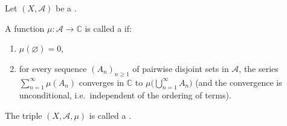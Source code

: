 \begin{definition} \label{definition:complex_measure}
Let $(X, \mathcal{A})$ be a .

A function $\mu : \mathcal{A} \to \mathbb{C}$ is called a  if:
\begin{enumerate}
    \item $\mu(\varnothing) = 0$,
    \item for every sequence $(A_n)_{n\ge 1}$ of pairwise disjoint sets in $\mathcal{A}$, the series $\sum_{n=1}^\infty \mu(A_n)$ converges in $\mathbb{C}$ to $\mu\bigl(\bigcup_{n=1}^\infty A_n\bigr)$ (and the convergence is unconditional, i.e.\ independent of the ordering of terms).
\end{enumerate}
The triple $(X, \mathcal{A}, \mu)$ is called a .
\end{definition}
